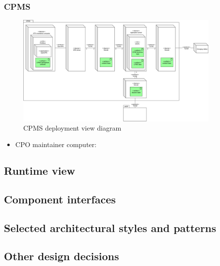 \subsubsection{\ac{CPMS}}
\begin{figure}[!h]
    \begin{center}
        \includegraphics[keepaspectratio, width=0.9\textwidth]{Graphics/DD-CPMS-deployment.drawio.png}
        \caption{CPMS deployment view diagram}
        \label{fig:CPMS-deployment}
    \end{center}
\end{figure}

\begin{itemize}
    \item \ac{CPO} maintainer computer:
\end{itemize}
\clearpage

\subsection{Runtime view}
\subsection{Component interfaces}
\subsection{Selected architectural styles and patterns}
\subsection{Other design decisions}
\clearpage